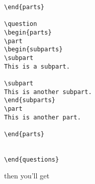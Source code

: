 \documentclass[12pt]{exam}
\begin{document}
\begin{verbatim}
\end{parts}

\question
\begin{parts}
\part
\begin{subparts}
\subpart
This is a subpart.

\subpart
This is another subpart.
\end{subparts}
\part
This is another part.

\end{parts}


\end{questions}
\end{verbatim}
then you'll get
\end{document}

